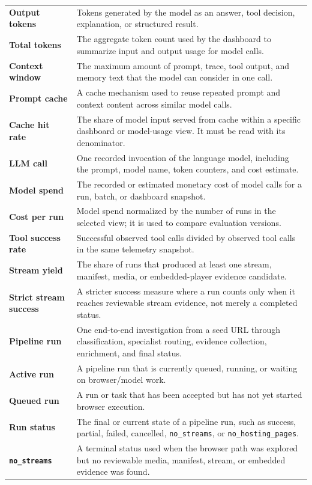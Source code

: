 \begin{longtable}{>{\raggedright\arraybackslash\bfseries}p{4.1cm}
                  >{\raggedright\arraybackslash}p{9.7cm}}
Output tokens & Tokens generated by the model as an answer, tool decision, explanation, or structured result. \\
Total tokens & The aggregate token count used by the dashboard to summarize input and output usage for model calls. \\
Context window & The maximum amount of prompt, trace, tool output, and memory text that the model can consider in one call. \\
Prompt cache & A cache mechanism used to reuse repeated prompt and context content across similar model calls. \\
Cache hit rate & The share of model input served from cache within a specific dashboard or model-usage view. It must be read with its denominator. \\
LLM call & One recorded invocation of the language model, including the prompt, model name, token counters, and cost estimate. \\
Model spend & The recorded or estimated monetary cost of model calls for a run, batch, or dashboard snapshot. \\
Cost per run & Model spend normalized by the number of runs in the selected view; it is used to compare evaluation versions. \\
Tool success rate & Successful observed tool calls divided by observed tool calls in the same telemetry snapshot. \\
Stream yield & The share of runs that produced at least one stream, manifest, media, or embedded-player evidence candidate. \\
Strict stream success & A stricter success measure where a run counts only when it reaches reviewable stream evidence, not merely a completed status. \\
Pipeline run & One end-to-end investigation from a seed URL through classification, specialist routing, evidence collection, enrichment, and final status. \\
Active run & A pipeline run that is currently queued, running, or waiting on browser/model work. \\
Queued run & A run or task that has been accepted but has not yet started browser execution. \\
Run status & The final or current state of a pipeline run, such as success, partial, failed, cancelled, \texttt{no\_streams}, or \texttt{no\_hosting\_\allowbreak pages}. \\
\texttt{no\_streams} & A terminal status used when the browser path was explored but no reviewable media, manifest, stream, or embedded evidence was found. \\

\end{longtable}
